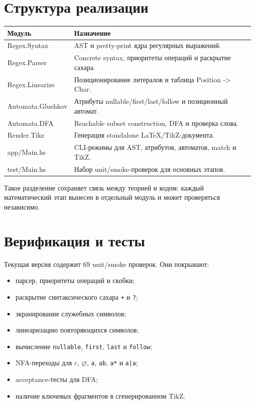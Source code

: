 \documentclass[12pt,a4paper]{article}
\begin{document}
\section{Структура реализации}

\begin{longtable}{>{\ttfamily}p{4.6cm}p{9.5cm}}
Модуль & Назначение \\
\hline
Regex.Syntax & AST и pretty-print ядра регулярных выражений. \\
Regex.Parser & Concrete syntax, приоритеты операций и раскрытие сахара. \\
Regex.Linearize & Позиционирование литералов и таблица Position -> Char. \\
Automata.Glushkov & Атрибуты nullable/first/last/follow и позиционный автомат. \\
Automata.DFA & Reachable subset construction, DFA и проверка слова. \\
Render.Tikz & Генерация standalone LaTeX/TikZ-документа. \\
app/Main.hs & CLI-режимы для AST, атрибутов, автоматов, match и TikZ. \\
test/Main.hs & Набор unit/smoke-проверок для основных этапов. \\
\end{longtable}

Такое разделение сохраняет связь между теорией и кодом: каждый математический
этап вынесен в отдельный модуль и может проверяться независимо.

\section{Верификация и тесты}

Текущая версия содержит 69 unit/smoke проверок. Они покрывают:
\begin{itemize}
  \item парсер, приоритеты операций и скобки;
  \item раскрытие синтаксического сахара \verb|+| и \verb|?|;
  \item экранирование служебных символов;
  \item линеаризацию повторяющихся символов;
  \item вычисление \verb|nullable|, \verb|first|, \verb|last| и \verb|follow|;
  \item NFA-переходы для $\varepsilon$, $\varnothing$, \verb|a|, \verb|ab|,
  \verb|a*| и \texttt{a|a};
  \item acceptance-тесты для DFA;
  \item наличие ключевых фрагментов в сгенерированном TikZ.
\end{itemize}
\end{document}
